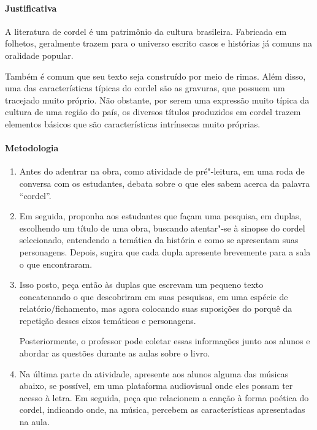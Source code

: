 \documentclass[12pt]{extarticle}
\begin{document}
{\paragraph{Justificativa} A literatura de
cordel é um patrimônio da cultura brasileira. Fabricada em folhetos,
geralmente trazem para o universo escrito casos e histórias já comuns na
oralidade popular.

Também é comum que seu texto seja construído por meio
de rimas. Além disso, uma das características típicas do cordel são as
gravuras, que possuem um tracejado muito próprio. Não obstante, por
serem uma expressão muito típica da cultura de uma região do país, os
diversos títulos produzidos em cordel trazem elementos básicos que são
características intrínsecas muito próprias.

\paragraph{Metodologia}

\begin{enumerate}
\item
Antes do adentrar na obra, como atividade de pré"-leitura,
em uma roda de conversa com os estudantes, debata sobre o que eles 
sabem acerca da palavra ``cordel''.  

\item
Em seguida, proponha aos estudantes que façam uma pesquisa, em duplas, 
escolhendo um título de uma obra, buscando atentar"-se à sinopse do cordel selecionado, entendendo a temática da história e como se apresentam suas 
personagens. Depois, sugira que cada dupla apresente brevemente para a 
sala o que encontraram. 

\item
Isso posto, peça então às duplas que escrevam um pequeno texto 
concatenando o que descobriram em suas pesquisas, em uma espécie de 
relatório/fichamento, mas agora colocando suas suposições do 
porquê da repetição desses eixos temáticos e personagens. 

Posteriormente, o professor pode coletar essas informações
junto aos alunos e abordar as questões durante as aulas sobre o livro.

\item
Na última parte da atividade, apresente aos alunos alguma das músicas 
abaixo, se possível, em uma plataforma audiovisual onde eles possam ter 
acesso à letra. 
Em seguida, peça que relacionem a canção à forma poética do cordel, 
indicando onde, na música, percebem as características apresentadas na aula. 


\end{enumerate}}
\end{document}
